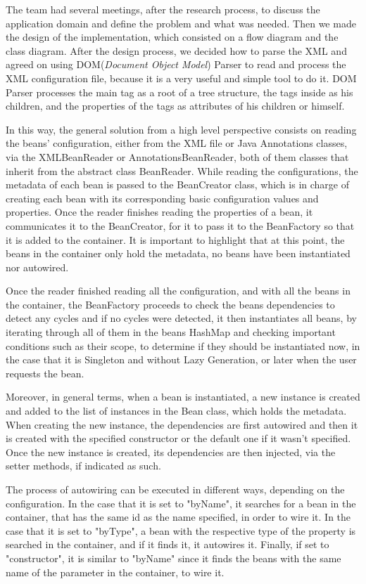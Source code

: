 \documentclass[a4paper, 12pt, notitlepage]{report}
\begin{document}
The team had several meetings, after the research process, to discuss the application domain and define the problem and what was needed. Then we made the design of the implementation, which consisted on a flow diagram and the class diagram. After the design process, we decided how to parse the XML and agreed on using DOM(\textit{Document Object Model}) Parser to read and process the XML configuration file, because it is a very useful and simple tool to do it. DOM Parser processes the main tag as a root of a tree structure, the tags inside as his children, and the properties of the tags as attributes of his children or himself. 

In this way, the general solution from a high level perspective consists on reading the beans' configuration, either from the XML file or Java Annotations classes, via the XMLBeanReader or AnnotationsBeanReader, both of them classes that inherit from the abstract class BeanReader. While reading the configurations, the metadata of each bean is passed to the BeanCreator class, which is in charge of creating each bean with its corresponding basic configuration values and properties. Once the reader finishes reading the properties of a bean, it communicates it to the BeanCreator, for it to pass it to the BeanFactory so that it is added to the container. It is important to highlight that at this point, the beans in the container only hold the metadata, no beans have been instantiated nor autowired.

Once the reader finished reading all the configuration, and with all the beans in the container, the BeanFactory proceeds to check the beans dependencies to detect any cycles and if no cycles were detected, it then instantiates all beans, by iterating through all of them in the beans HashMap and checking important conditions such as their scope, to determine if they should be instantiated now, in the case that it is Singleton and without Lazy Generation, or later when the user requests the bean. 

Moreover, in general terms, when a bean is instantiated, a new instance is created and added to the list of instances in the Bean class, which holds the metadata. When creating the new instance, the dependencies are first autowired and then it is created with the specified constructor or the default one if it wasn't specified. Once the new instance is created, its dependencies are then injected, via the setter methods, if indicated as such.

The process of autowiring can be executed in different ways, depending on the configuration. In the case that it is set to "byName", it searches for a bean in the container, that has the same id as the name specified, in order to wire it. In the case that it is set to "byType", a bean with the respective type of the property is searched in the container, and if it finds it, it autowires it. Finally, if set to "constructor", it is similar to "byName" since it finds the beans with the same name of the parameter in the container, to wire it. 
\end{document}
